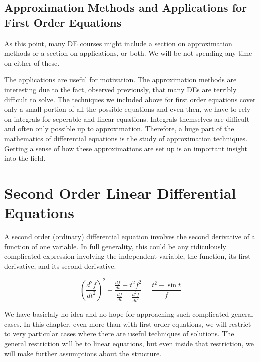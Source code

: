 \documentclass[fleqn,letterpaper]{report}
\begin{document}
\section{Approximation Methods and Applications for First Order Equations}
\label{approximation-methods}

As this point, many DE courses might include a section on
approximation methods or a section on applications, or both.
We will be not spending any time on either of these.

The applications are useful for motivation. The approximation
methods are interesting due to the fact, observed previously,
that many DEs are terribly difficult to solve. The
techniques we included above for first order equations cover
only a small portion of all the possible equations and even then,
we have to rely on integrals for seperable and linear
equations. Integrals themselves are difficult and often only
possible up to approximation. Therefore, a huge part of the
mathematics of differential equations is the study of
approximation techniques. Getting a sense of how these
approximations are set up is an important insight into the field.

\chapter{Second Order Linear Differential Equations}
\label{second-order-odes}

A second order (ordinary) differential equation involves the
second derivative of a function of one variable. In full
generality, this could be any ridiculously complicated
expression involving the independent variable, the function,
its first derivative, and its second derivative. 

\begin{example}
\begin{equation*}
\left( \frac{d^2 f}{dt^2} \right)^2 + \frac{\frac{df}{dt} - t^2
f^2}{\frac{df}{dt} - \frac{d^2 f}{dt^2}} = \frac{t^2 - \sin
t}{f}
\end{equation*}
\end{example}

We have basiclaly no idea and no hope for approaching such
complicated general cases. In this chapter, even more than
with first order equations, we will restrict to very
particular cases where there are useful techniques of
solutions. The general restriction will be to linear
equations, but even inside that restriction, we will make
further assumptions about the structure. 
\end{document}

